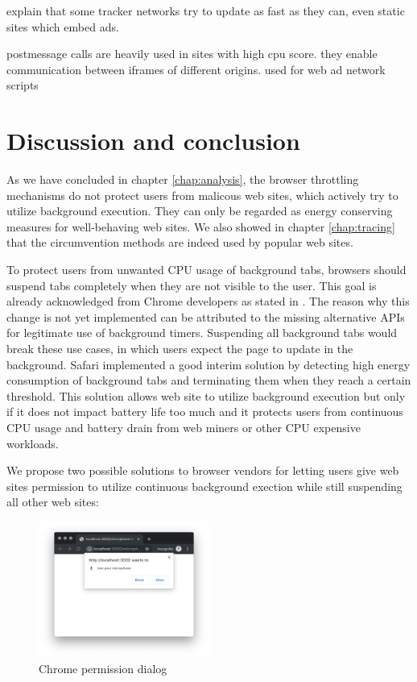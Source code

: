 \documentclass[
	ruledheaders=section,%
	class=report,%
	thesis={type=bachelor},%
	accentcolor=9c,%
	custommargins=true,%
	marginpar=false,%
	parskip=half-,%
	fontsize=11pt,%
]{tudapub}
\begin{document}
  explain that some tracker networks try to update as fast as they can, even static sites which embed ads.

  postmessage calls are heavily used in sites with high cpu score. they enable communication between iframes of different origins. used for web ad network scripts
  
  
  
  \newpage
  \chapter{Discussion and conclusion}

  As we have concluded in chapter \ref{chap:analysis}, the browser throttling mechanisms do not protect users from malicous web sites, which actively try to utilize background execution. They can only be regarded as energy conserving measures for well-behaving web sites. We also showed in chapter \ref{chap:tracing} that the circumvention methods are indeed used by popular web sites.

  To protect users from unwanted CPU usage of background tabs, browsers should suspend tabs completely when they are not visible to the user. This goal is already acknowledged from Chrome developers as stated in \cite{chrome-background-tabs-roadmap}. The reason why this change is not yet implemented can be attributed to the missing alternative APIs for legitimate use of background timers. Suspending all background tabs would break these use cases, in which users expect the page to update in the background. Safari implemented a good interim solution by detecting high energy consumption of background tabs and terminating them when they reach a certain threshold. This solution allows web site to utilize background execution but only if it does not impact battery life too much and it protects users from continuous CPU usage and battery drain from web miners or other CPU expensive workloads.

  We propose two possible solutions to browser vendors for letting users give web sites permission to utilize continuous background exection while still suspending all other web sites:

  \begin{figure}
    \centering
    \includegraphics[width=0.5\textwidth]{images/microphone-permission.png}
    \caption{Chrome permission dialog}
    \label{fig:chrome-permission-dialog}
  \end{figure}
\end{document}

